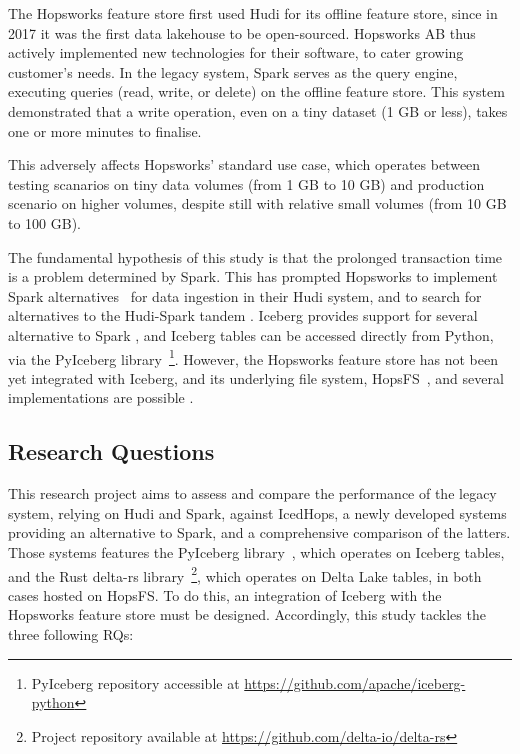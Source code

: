 The Hopsworks feature store \cite{10.1145/3626246.3653389} first used Hudi for its offline feature store, since in 2017 it was the first data lakehouse to be open-sourced. Hopsworks AB thus actively implemented new technologies for their software, to cater growing customer's needs. In the legacy system, Spark serves as the query engine, executing queries (read, write, or delete) on the offline feature store. This system demonstrated that a write operation, even on a tiny dataset (1 GB or less), takes one or more minutes to finalise.

This adversely affects Hopsworks' standard use case, which operates between testing scanarios on tiny data volumes (from 1 GB to 10 GB) and production scenario on higher volumes, despite still with relative small volumes (from 10 GB to 100 GB).

The fundamental hypothesis of this study is that the prolonged transaction time is a problem determined by Spark. This has prompted Hopsworks to implement Spark alternatives~\cite{Khazanchi1801362} for data ingestion in their Hudi system, and to search for alternatives to the Hudi-Spark tandem \cite{manfrediReducingReadWrite2024}.
Iceberg provides support for several alternative to Spark \cite{OngoingEvolutionTableFormat}, and Iceberg tables can be accessed directly from Python, via the PyIceberg library~\footnote{PyIceberg repository accessible at \url{https://github.com/apache/iceberg-python}}.
However, the Hopsworks feature store has not been yet integrated with Iceberg, and its underlying file system, \gls{HopsFS}~\cite{niaziHopsFSScalingHierarchical2017}, and several implementations are possible \cite{shiranApacheIcebergDefinitive2024}.


\subsection{Research Questions} 
\label{subsec:research_questions}

This research project aims to assess and compare the performance of the legacy system, relying on Hudi and Spark, against IcedHops, a newly developed systems providing an alternative to Spark, and a comprehensive comparison of the latters. Those systems features the PyIceberg library~\footnotemark[\value{footnote}], which operates on Iceberg tables, and the Rust delta-rs library~\footnote{Project repository available at \url{https://github.com/delta-io/delta-rs}}, which operates on Delta Lake tables, in both cases hosted on \gls{HopsFS}. To do this, an integration of Iceberg with the Hopsworks feature store must be designed. Accordingly, this study tackles the three following \glspl{RQ}:

